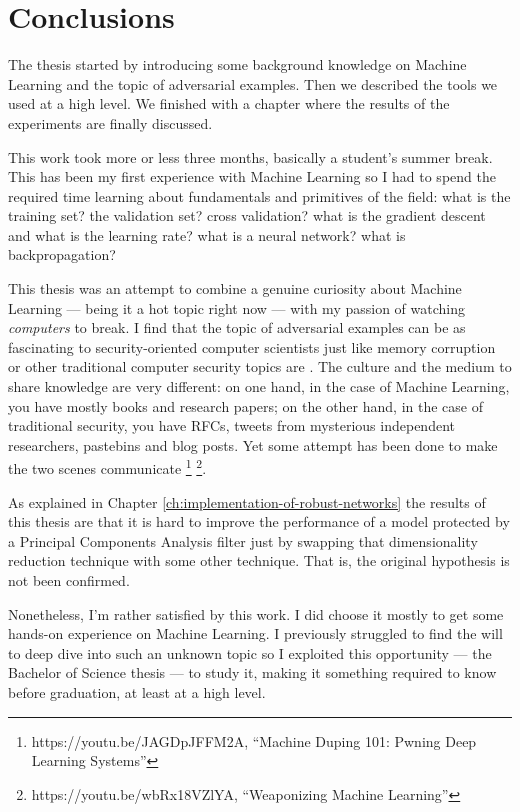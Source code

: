 \chapter*{Conclusions}

The thesis started by introducing some background knowledge on Machine
Learning and the topic of adversarial examples. Then we described the
tools we used at a high level. We finished with a chapter where the
results of the experiments are finally discussed.

This work took more or less three months, basically a student's summer
break. This has been my first experience with Machine Learning so I had
to spend the required time learning about fundamentals and primitives
of the field: what is the training set? the validation set? cross
validation? what is the gradient descent and what is the learning rate?
what is a neural network? what is backpropagation?

This thesis was an attempt to combine a genuine curiosity about Machine
Learning --- being it a hot topic right now --- with my passion of
watching \emph{computers} to break. I find that the topic of
adversarial examples can be as fascinating to security-oriented
computer scientists just like memory corruption or other traditional
computer security topics are \cite{DBLP:journals/corr/PapernotMSW16}.
The culture and the medium to share knowledge are very different: on
one hand, in the case of Machine Learning, you have mostly books and
research papers; on the other hand, in the case of traditional
security, you have RFCs, tweets from mysterious independent
researchers, pastebins and blog posts. Yet some attempt has been done
to make the two scenes communicate%
\footnote{https://youtu.be/JAGDpJFFM2A, ``Machine Duping 101: Pwning
  Deep Learning Systems''}
\footnote{https://youtu.be/wbRx18VZlYA, ``Weaponizing Machine
  Learning''}.

As explained in Chapter \ref{ch:implementation-of-robust-networks} the
results of this thesis are that it is hard to improve the performance of
a model protected by a Principal Components Analysis filter just by
swapping that dimensionality reduction technique with some other
technique. That is, the original hypothesis is not been confirmed.

Nonetheless, I'm rather satisfied by this work. I did choose it mostly
to get some hands-on experience on Machine Learning. I previously
struggled to find the will to deep dive into such an unknown topic so I
exploited this opportunity --- the Bachelor of Science thesis --- to
study it, making it something required to know before graduation, at
least at a high level.
